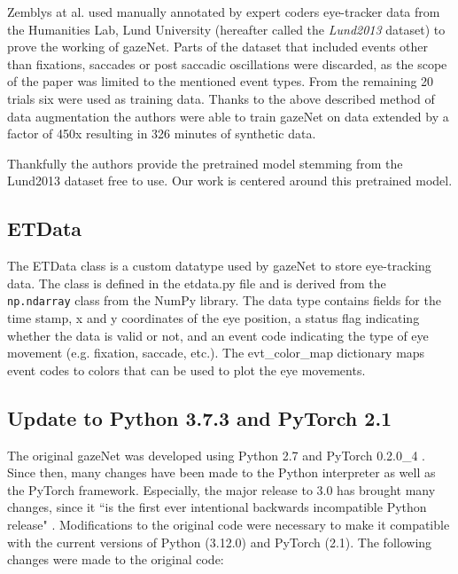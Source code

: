 \documentclass[conference]{IEEEtran}
\begin{document}
Zemblys at al. \cite{zemblys2018gazeNet} used manually annotated by expert coders eye-tracker data from the Humanities Lab, Lund University (hereafter called the \emph{Lund2013} dataset) to prove the working of gazeNet. Parts of the dataset that included events other than fixations, saccades or post saccadic oscillations were discarded, as the scope of the paper was limited to the mentioned event types. From the remaining 20 trials six were used as training data. Thanks to the above described method of data augmentation the authors were able to train gazeNet on data extended by a factor of 450x resulting in 326 minutes of synthetic data.

Thankfully the authors provide the pretrained model stemming from the Lund2013 dataset free to use. Our work is centered around this pretrained model.


\subsection{ETData}
The ETData class is a custom datatype used by gazeNet to store eye-tracking data. The class is defined in the etdata.py file and is derived from the \verb|np.ndarray| class from the NumPy library. The data type contains fields for the time stamp, x and y coordinates of the eye position, a status flag indicating whether the data is valid or not, and an event code indicating the type of eye movement (e.g. fixation, saccade, etc.). The evt\_color\_map dictionary maps event codes to colors that can be used to plot the eye movements.


\subsection{Update to Python 3.7.3 and PyTorch 2.1}
The original gazeNet was developed using Python 2.7 and PyTorch 0.2.0\_4 \cite{zemblys2018gazeNet}. Since then, many changes have been made to the Python interpreter as well as the PyTorch framework. Especially, the major release to 3.0 has brought many changes, since it ``is the first ever intentional backwards incompatible Python release" \cite{van_Rossum_2009}. Modifications to the original code were necessary to make it compatible with the current versions of Python (3.12.0) and PyTorch (2.1). The following changes were made to the original code:
\end{document}
